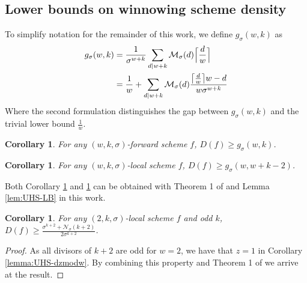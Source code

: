 \documentclass{article}
\newtheorem{corollary}[theorem]{Corollary}
\DeclarePairedDelimiter\ceil{\lceil}{\rceil}
\begin{document}
\subsection{Lower bounds on winnowing scheme density}
To simplify notation for the remainder of this work, we define $g_\sigma(w, k)$ as 
\begin{align*}
g_\sigma(w, k)&=\frac{1}{\sigma^{w+k}}\sum_{d|w+k}\mathcal{M}_\sigma(d)\Big\lceil \frac{d}{w}\Big\rceil\\
     &=\frac{1}{w} 
+ \sum_{d|w+k}\mathcal{M}_\sigma(d)\frac{\ceil*{\frac{d}{w}}w - d}{w\sigma^{w+k}}
\end{align*}
Where the second formulation distinguishes the gap between $g_\sigma(w, k)$ and the trivial lower bound $\frac{1}{w}$.
\begin{corollary}
\label{cor:fwd-dens-LB}
For any $(w, k, \sigma)$-forward scheme $f$, $D(f) \geq g_\sigma(w,k)$.
\end{corollary}
\begin{corollary}
    \label{cor:local-dens-LB}
For any $(w, k, \sigma)$-local scheme $f$, $D(f) \geq g_\sigma(w,w+k-2)$.
\end{corollary}
Both Corollary \ref{cor:fwd-dens-LB} and \ref{cor:local-dens-LB} can be obtained  with Theorem 1 of \cite{zheng2021lower} and Lemma \ref{lem:UHS-LB} in this work.


\begin{corollary}
    \label{cor:w2-closed}
For any $(2, k, \sigma)$-local scheme $f$ and odd $k$, $D(f)\geq \frac{\sigma^{k+2}+\mathcal{N_\sigma}(k+2)}{2\sigma^{k+2}}$.
\end{corollary}
\begin{proof}
As all divisors of $k+2$ are odd for $w=2$, we have that $z=1$ in Corollary \ref{lemma:UHS-dzmodw}. By combining this property and Theorem 1 of \cite{zheng2021lower} we arrive at the result.
\end{proof}
\end{document}
